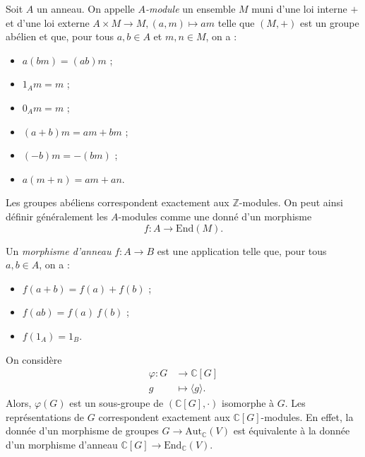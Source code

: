 \documentclass[./main]{subfiles}
\begin{document}
  \begin{defn}
    Soit $A$ un anneau.
    On appelle  \textit{$A$-module} un ensemble $M$ muni d'une loi interne $+$ et d'une loi externe $A \times M \to M, (a, m) \mapsto a m$ telle que $(M, +)$ est un groupe abélien et que, pour tous  $a, b \in A$ et $m, n \in M$, on a :
    \begin{itemize}
      \item $a(bm) = (ab)m$ ;
      \item  $1_A m = m$ ;
      \item  $0_A m = m$ ;
      \item $(a+b) m = am + bm$ ;
      \item $(-b) m = -(bm)$ ;
      \item  $a(m+n) = am + an$.
    \end{itemize}
  \end{defn}

  \begin{rmk}
    Les groupes abéliens correspondent exactement aux $\mathds{Z}$-modules.
    On peut ainsi définir généralement les $A$-modules comme une donné d'un morphisme \[
    f : A \to \mathrm{End}(M)
    .\]
  \end{rmk}

  \begin{defn}
    Un \textit{morphisme d'anneau} $f : A \to B$ est une application telle que, pour tous $a, b \in A$, on a :
    \begin{itemize}
      \item $f(a + b) = f(a) + f(b)$ ;
      \item  $f(ab) = f(a) \: f(b)$ ;
      \item  $f(1_A) = 1_B$.
    \end{itemize}
  \end{defn}

  \begin{exm}
    On considère \begin{align*}
      \varphi: G &\longrightarrow \mathds{C}[G] \\
      g &\longmapsto \langle g \rangle
    .\end{align*}
    Alors, $\varphi(G)$ est un sous-groupe de  $(\mathds{C}[G], \cdot)$ isomorphe à $G$.
    Les représentations de $G$ correspondent exactement aux $\mathds{C}[G]$-modules. En effet, la donnée d'un morphisme de groupes $G \to \mathrm{Aut}_\mathds{C}(V)$ est équivalente à la donnée d'un morphisme d'anneau $\mathds{C}[G] \to \mathrm{End}_\mathds{C}(V)$.
  \end{exm}
\end{document}
